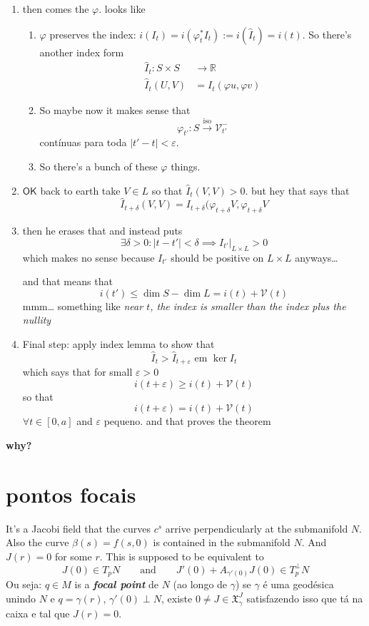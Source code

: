\begin{enumerate}
\item then comes the \(\varphi\). looks like
\begin{enumerate}[label=(\alph*)]
\item \(\varphi\) preserves the index: \(i(I_t)=i(\varphi_t^*I_t):=i(\hat{I}_t)=i(t)\). So there's another index form
	\begin{align*}
		\hat{I}_t: S \times S &\longrightarrow \mathbb{R} \\
		\hat{I}_t(U,V) &= I_t(\varphi u,\varphi v)
	\end{align*}
\item So maybe now it makes sense that
	\[\varphi_{t'}:S \overset{\operatorname{iso}}{\longrightarrow}\mathcal{V}_{t'}^-\]
	contínuas para toda \(|t'-t|<\varepsilon\).
\item So there's a bunch of these \(\varphi\) things.
\end{enumerate}
\item \(\mathsf{OK}\) back to earth take \(V \in L\) so that \(\hat{I}_t(V,V)>0\). but hey that says that
	\[\hat{I}_{t+\delta}(V,V)=I_{t+\delta}(\varphi_{t+\delta}V,\varphi_{t+\delta}V\]
\item then he erases that and instead puts
	\[\exists  \delta>0: |t-t'|<\delta \implies I_{t'}|_{L \times L}>0\]
	 {\color{2}which makes no sense} because \(I_{t'}\) should be positive on \(L \times L\) anyways…

	 and that means that
	 \[i(t') \leq \dim S- \dim L=i(t)+\mathcal{V}(t)\]
	 mmm… something like \textit{near \(t\), the index is smaller than the index plus the nullity} 
\item Final step: apply index lemma to show that
	\[\hat{I}_t > \hat{I}_{t+\varepsilon}\text{ em } \ker I_t\]
which says that for small \(\varepsilon>0\) 
\[i(t+\varepsilon)\geq  i(t)+\mathcal{V}(t)\]
so that
\[\boxed{i(t+\varepsilon)=i(t)+\mathcal{V}(t)}\]
\( \forall t \in [0,a]\) and  \(\varepsilon\) pequeno. and that proves the theorem
	
\end{enumerate}
\textbf{why?}


\section{pontos focais}

It's a Jacobi field that the curves \(c^s\) arrive perpendicularly at the submanifold \(N\). Also the curve \(\beta(s)=f(s,0)\) is contained in the submanifold \(N\). And \(J(r)=0\) for some \(r\). This is supposed to be equivalent to 
\[J(0) \in T_p N\qquad  \text{and} \qquad J'(0)+A_{\gamma'(0)}J(0) \in T_p^{\perp}N\]
Ou seja: \(q \in M\) is a \textit{\textbf{focal point}} de \(N\) (ao longo de \(\gamma\)) se \(\gamma\) é uma geodésica unindo \(N\) e \(q=\gamma(r)\), \(\gamma'(0) \perp N\), existe \(0 \neq  J \in \mathfrak{X}^J_\gamma\) satisfazendo isso que tá na caixa e tal que \(J(r)=0\).

